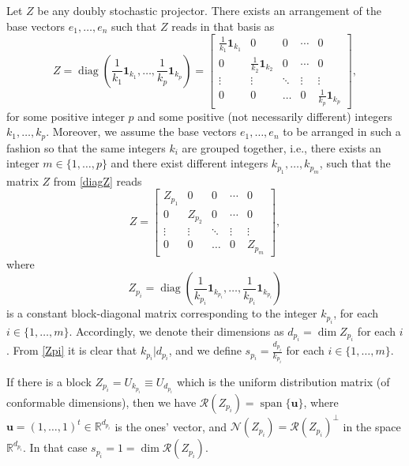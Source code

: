 \documentclass{article}
\theoremstyle{definition}\newtheorem{example}{Example}[section]
\def\N{{\mathcal{N}}}
\def\R{{\mathcal{R}}}
\def\RR{\mathbb{R}}
\begin{document}
Let $Z$ be any doubly stochastic projector. There exists an arrangement of the base vectors $e_1,\ldots,e_n$ such that $Z$ reads in that basis as
	\begin{equation}
		\label{diagZ}Z=\operatorname{diag}\left(\frac{1}{k_1}\mathbf{1}_{k_1},\ldots,\frac{1}{k_p}\mathbf{1}_{k_p}\right)=\left[\begin{array}{ccccc}\frac{1}{k_1}\mathbf{1}_{k_1} & 0 & 0 &\cdots & 0\\
			0 & \frac{1}{k_2}\mathbf{1}_{k_2} & 0 & \cdots & 0\\
			\vdots & \vdots & \ddots & \vdots & \vdots\\
			0 & 0 & \ldots & 0 & \frac{1}{k_p}\mathbf{1}_{k_p}\end{array}\right],\end{equation}
	for some positive integer $p$ and some positive (not necessarily different) integers $k_1,\ldots,k_p$. Moreover, we assume the base vectors $e_1,\ldots,e_n$ to be arranged in such a fashion so that the same integers $k_i$ are grouped together, i.e., there exists an integer $m\in\{1,\ldots, p\}$ and there exist different integers $k_{p_1},\ldots, k_{p_m}$, such that the matrix $Z$ from \eqref{diagZ}  reads
		\begin{equation}
			\label{diagpZ}Z=\left[\begin{array}{ccccc}Z_{p_1} & 0 & 0 &\cdots & 0\\
				0 & Z_{p_2} & 0 & \cdots & 0\\
				\vdots & \vdots & \ddots & \vdots & \vdots\\
				0 & 0 & \ldots & 0 & Z_{p_{m}}\end{array}\right],\end{equation} 
	where 	\begin{equation}
			\label{Zpi}Z_{p_i}=\operatorname{diag}\left(\frac{1}{k_{p_{i}}}\mathbf{1}_{k_{p_i}},\ldots,\frac{1}{k_{p_{i}}}\mathbf{1}_{k_{p_i}}\right) 
		\end{equation}
	is a constant block-diagonal matrix corresponding to the integer $k_{p_i}$, for each $i\in\{1,\ldots,m\}$. Accordingly, we denote their dimensions as $d_{p_i}=\dim Z_{p_i}$ for each $i$. From \eqref{Zpi} it is clear that $k_{p_i}|d_{p_i}$, and we define $s_{p_i}=\frac{d_{p_i}}{k_{p_i}}$ for each $i\in\{1,\ldots,m\}$.
	
			
If  there is  a block $Z_{p_i}=U_{k_{p_i}}\equiv U_{d_{p_i}}$ which is the uniform distribution matrix (of conformable dimensions), then  we have $\R(Z_{p_i})=\operatorname{span}\{\mathbf{u}\}$, where $\mathbf{u}=(1,\ldots,1)^t\in \RR^{d_{p_i}}$ is the ones' vector, and $\N(Z_{p_i})=\R(Z_{p_i})^\perp$ in the space $\RR^{d_{p_i}}$. In that case $s_{p_i}=1=\dim \R(Z_{p_i})$.
\end{document}
